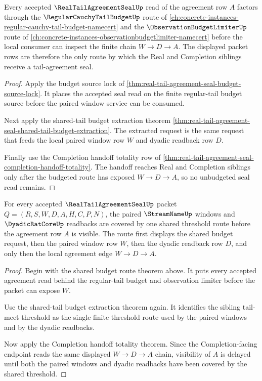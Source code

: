 \begin{theorem}
\label{thm:real-tail-agreement-seal-shared-budget-route}
Every accepted $\RealTailAgreementSealUp$ read of the agreement row $A$ factors through the $\RegularCauchyTailBudgetUp$ route of \autoref{ch:concrete-instances-regular-cauchy-tail-budget-namecert} and the $\ObservationBudgetLimiterUp$ route of \autoref{ch:concrete-instances-observationbudgetlimiter-namecert} before the local consumer can inspect the finite chain $W \to D \to A$. The displayed packet rows are therefore the only route by which the Real and Completion siblings receive a tail-agreement seal.
\end{theorem}
\begin{proof}
Apply the budget source lock of \autoref{thm:real-tail-agreement-seal-budget-source-lock}. It places the accepted seal read on the finite regular-tail budget source before the paired window service can be consumed.

Next apply the shared-tail budget extraction theorem \autoref{thm:real-tail-agreement-seal-shared-tail-budget-extraction}. The extracted request is the same request that feeds the local paired window row $W$ and dyadic readback row $D$.

Finally use the Completion handoff totality row of \autoref{thm:real-tail-agreement-seal-completion-handoff-totality}. The handoff reaches Real and Completion siblings only after the budgeted route has exposed $W \to D \to A$, so no unbudgeted seal read remains.
\end{proof}

\begin{theorem}
\label{thm:real-tail-agreement-seal-paired-threshold-coverage}
For every accepted $\RealTailAgreementSealUp$ packet $Q=(R,S,W,D,A,H,C,P,N)$, the paired $\StreamNameUp$ windows and $\DyadicRatCoreUp$ readbacks are covered by one shared threshold route before the agreement row $A$ is visible. The route first displays the shared budget request, then the paired window row $W$, then the dyadic readback row $D$, and only then the local agreement edge $W \to D \to A$.
\end{theorem}
\begin{proof}
Begin with the shared budget route theorem above. It puts every accepted agreement read behind the regular-tail budget and observation limiter before the packet can expose $W$.

Use the shared-tail budget extraction theorem again. It identifies the sibling tail-meet threshold as the single finite threshold route used by the paired windows and by the dyadic readbacks.

Now apply the Completion handoff totality theorem. Since the Completion-facing endpoint reads the same displayed $W \to D \to A$ chain, visibility of $A$ is delayed until both the paired windows and dyadic readbacks have been covered by the shared threshold.
\end{proof}

